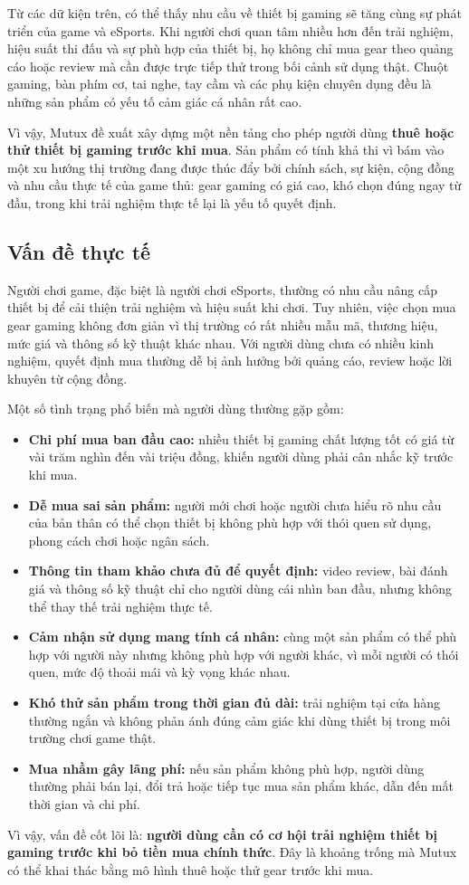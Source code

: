 Từ các dữ kiện trên, có thể thấy nhu cầu về thiết bị gaming sẽ tăng cùng sự phát triển của game và eSports. Khi người chơi quan tâm nhiều hơn đến trải nghiệm, hiệu suất thi đấu và sự phù hợp của thiết bị, họ không chỉ mua gear theo quảng cáo hoặc review mà cần được trực tiếp thử trong bối cảnh sử dụng thật. Chuột gaming, bàn phím cơ, tai nghe, tay cầm và các phụ kiện chuyên dụng đều là những sản phẩm có yếu tố cảm giác cá nhân rất cao.

Vì vậy, Mutux đề xuất xây dựng một nền tảng cho phép người dùng \textbf{thuê hoặc thử thiết bị gaming trước khi mua}. Sản phẩm có tính khả thi vì bám vào một xu hướng thị trường đang được thúc đẩy bởi chính sách, sự kiện, cộng đồng và nhu cầu thực tế của game thủ: gear gaming có giá cao, khó chọn đúng ngay từ đầu, trong khi trải nghiệm thực tế lại là yếu tố quyết định.


\subsection{Vấn đề thực tế}

Người chơi game, đặc biệt là người chơi eSports, thường có nhu cầu nâng cấp thiết bị để cải thiện trải nghiệm và hiệu suất khi chơi. Tuy nhiên, việc chọn mua gear gaming không đơn giản vì thị trường có rất nhiều mẫu mã, thương hiệu, mức giá và thông số kỹ thuật khác nhau. Với người dùng chưa có nhiều kinh nghiệm, quyết định mua thường dễ bị ảnh hưởng bởi quảng cáo, review hoặc lời khuyên từ cộng đồng.

Một số tình trạng phổ biến mà người dùng thường gặp gồm:

\begin{itemize}
    \item \textbf{Chi phí mua ban đầu cao:} nhiều thiết bị gaming chất lượng tốt có giá từ vài trăm nghìn đến vài triệu đồng, khiến người dùng phải cân nhắc kỹ trước khi mua.
    \item \textbf{Dễ mua sai sản phẩm:} người mới chơi hoặc người chưa hiểu rõ nhu cầu của bản thân có thể chọn thiết bị không phù hợp với thói quen sử dụng, phong cách chơi hoặc ngân sách.
    \item \textbf{Thông tin tham khảo chưa đủ để quyết định:} video review, bài đánh giá và thông số kỹ thuật chỉ cho người dùng cái nhìn ban đầu, nhưng không thể thay thế trải nghiệm thực tế.
    \item \textbf{Cảm nhận sử dụng mang tính cá nhân:} cùng một sản phẩm có thể phù hợp với người này nhưng không phù hợp với người khác, vì mỗi người có thói quen, mức độ thoải mái và kỳ vọng khác nhau.
    \item \textbf{Khó thử sản phẩm trong thời gian đủ dài:} trải nghiệm tại cửa hàng thường ngắn và không phản ánh đúng cảm giác khi dùng thiết bị trong môi trường chơi game thật.
    \item \textbf{Mua nhầm gây lãng phí:} nếu sản phẩm không phù hợp, người dùng thường phải bán lại, đổi trả hoặc tiếp tục mua sản phẩm khác, dẫn đến mất thời gian và chi phí.
\end{itemize}

Vì vậy, vấn đề cốt lõi là: \textbf{người dùng cần có cơ hội trải nghiệm thiết bị gaming trước khi bỏ tiền mua chính thức}. Đây là khoảng trống mà Mutux có thể khai thác bằng mô hình thuê hoặc thử gear trước khi mua.


